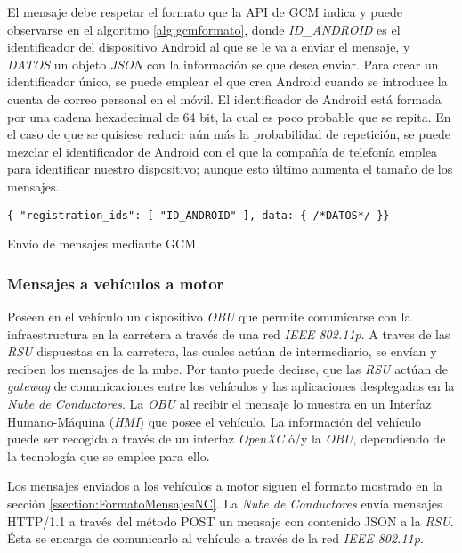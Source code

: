El mensaje debe respetar el formato que la API de GCM indica y puede observarse en el algoritmo \ref{alg:gcmformato}, donde \emph{ID\_ANDROID} es el identificador del dispositivo Android al que se le va a enviar el mensaje, y \emph{DATOS} un objeto \emph{JSON} con la información se que desea enviar. Para crear un identificador único, se puede emplear el que crea Android cuando se introduce la cuenta de correo personal en el móvil. El identificador de Android está formada por una cadena hexadecimal de 64 bit, la cual es poco probable que se repita. En el caso de que se quisiese reducir aún más la probabilidad de repetición, se puede mezclar el identificador de Android con el que la compañía de telefonía emplea para identificar nuestro dispositivo; aunque esto último aumenta el tamaño de los mensajes.

\begin{listing}
	\begin{minipage}{.4\textwidth}
		\begin{verbatim}
{ "registration_ids": [ "ID_ANDROID" ], data: { /*DATOS*/ }}
		\end{verbatim}
	\end{minipage}
	\caption{Envío de mensajes mediante GCM}\label{alg:gcmformato}
\end{listing}

\subsubsection{Mensajes a vehículos a motor}\label{sssection:mensajesvehiculomotor}
Poseen en el vehículo un dispositivo \emph{OBU} que permite comunicarse con la infraestructura en la carretera a través de una red \emph{IEEE 802.11p}. A traves de las \emph{RSU} dispuestas en la carretera, las cuales actúan de intermediario, se envían y reciben los mensajes de la nube. Por tanto puede decirse, que las \emph{RSU} actúan de \emph{gateway} de comunicaciones entre los vehículos y las aplicaciones desplegadas en la \emph{Nube de Conductores}. La \emph{OBU} al recibir el mensaje lo muestra en un Interfaz Humano-Máquina (\emph{HMI}) que posee el vehículo. La información del vehículo puede ser recogida a través de un interfaz \emph{OpenXC} ó/y la \emph{OBU}, dependiendo de la tecnología que se emplee para ello.

Los mensajes enviados a los vehículos a motor siguen el formato mostrado en la sección \ref{ssection:FormatoMensajesNC}. La \emph{Nube de Conductores} envía mensajes HTTP/1.1 a través del método POST un mensaje con contenido JSON a la \emph{RSU}. \'Esta se encarga de comunicarlo al vehículo a través de la red \emph{IEEE 802.11p}.

